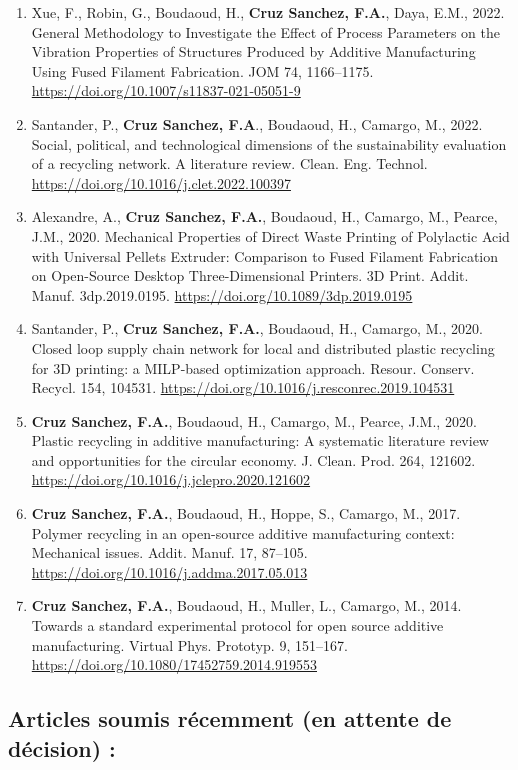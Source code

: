 \documentclass[
  12pt,
  oneside]{book}
\begin{document}
\begin{enumerate}
\def\labelenumi{\arabic{enumi}.}
\item
  Xue, F., Robin, G., Boudaoud, H., \textbf{Cruz Sanchez, F.A.}, Daya, E.M., 2022. General Methodology to Investigate the Effect of Process Parameters on the Vibration Properties of Structures Produced by Additive Manufacturing Using Fused Filament Fabrication. JOM 74, 1166--1175. \url{https://doi.org/10.1007/s11837-021-05051-9}
\item
  Santander, P., \textbf{Cruz Sanchez, F.A}., Boudaoud, H., Camargo, M., 2022. Social, political, and technological dimensions of the sustainability evaluation of a recycling network. A literature review. Clean. Eng. Technol. \url{https://doi.org/10.1016/j.clet.2022.100397}
\item
  Alexandre, A., \textbf{Cruz Sanchez, F.A.}, Boudaoud, H., Camargo, M., Pearce, J.M., 2020. Mechanical Properties of Direct Waste Printing of Polylactic Acid with Universal Pellets Extruder: Comparison to Fused Filament Fabrication on Open-Source Desktop Three-Dimensional Printers. 3D Print. Addit. Manuf. 3dp.2019.0195. \url{https://doi.org/10.1089/3dp.2019.0195}
\item
  Santander, P., \textbf{Cruz Sanchez, F.A.}, Boudaoud, H., Camargo, M., 2020. Closed loop supply chain network for local and distributed plastic recycling for 3D printing: a MILP-based optimization approach. Resour. Conserv. Recycl. 154, 104531. \url{https://doi.org/10.1016/j.resconrec.2019.104531}
\item
  \textbf{Cruz Sanchez, F.A.}, Boudaoud, H., Camargo, M., Pearce, J.M., 2020. Plastic recycling in additive manufacturing: A systematic literature review and opportunities for the circular economy. J. Clean. Prod. 264, 121602. \url{https://doi.org/10.1016/j.jclepro.2020.121602}
\item
  \textbf{Cruz Sanchez, F.A.}, Boudaoud, H., Hoppe, S., Camargo, M., 2017. Polymer recycling in an open-source additive manufacturing context: Mechanical issues. Addit. Manuf. 17, 87--105. \url{https://doi.org/10.1016/j.addma.2017.05.013}
\item
  \textbf{Cruz Sanchez, F.A.}, Boudaoud, H., Muller, L., Camargo, M., 2014. Towards a standard experimental protocol for open source additive manufacturing. Virtual Phys. Prototyp. 9, 151--167. \url{https://doi.org/10.1080/17452759.2014.919553}
\end{enumerate}

\hypertarget{articles-soumis-ruxe9cemment-en-attente-de-duxe9cision}{%
\subsection{Articles soumis récemment (en attente de décision) :}\label{articles-soumis-ruxe9cemment-en-attente-de-duxe9cision}}
\end{document}
